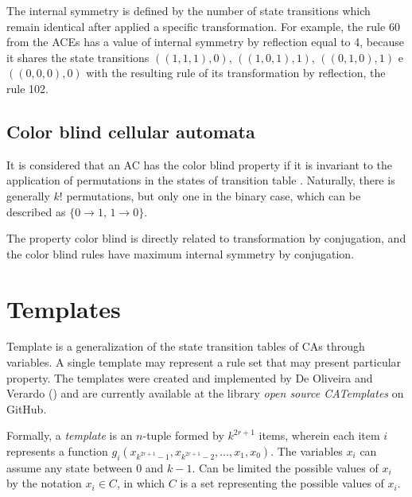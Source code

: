 \documentclass[12pt, a4paper]{article}
\begin{document}

The internal symmetry is defined by the number of state transitions which remain identical after applied a specific transformation. For example, the rule 60 from the ACEs has a value of internal symmetry by reflection equal to 4, because it shares the state transitions $((1,1,1),0)$, $((1,0,1),1)$, $((0,1,0),1)$ e $ ((0,0,0),0)$ with the resulting rule of its transformation by reflection, the rule 102.

\subsection{Color blind cellular automata}
It is considered that an AC has the color blind property if it is invariant to the application of permutations in the states of transition table \cite{salo2013color}. Naturally, there is generally $k!$ permutations, but only one in the binary case, which can be described as $\{0 \to 1 ,\, 1 \to 0\}$. 

The property color blind is directly related to transformation by conjugation, and the color blind rules have maximum internal symmetry by conjugation.

\section{Templates}
\label{sec:templates}
Template is a generalization of the state transition tables of CAs through variables. A single template may represent a rule set that may present particular property. The templates were created and implemented by De Oliveira and Verardo (\citeyear{deOliveira2014}) and are currently available at the library \textit{open source CATemplates} \cite{CATemplates} on GitHub.

Formally, a \textit{template} is an $n$-tuple formed by $k^{2r+1}$ items, wherein each item $i$ represents a function $g_i(x_{k^{2r+1}-1},x_{k^{2r+1}-2},\dots,x_1,x_0)$. The variables $x_i$ can assume any state between 0 and $k-1$. Can be limited the possible values of $x_i$ by the notation $x_i \in C$, in which $C$ is a set representing the possible values of $x_i$. %
\end{document}
